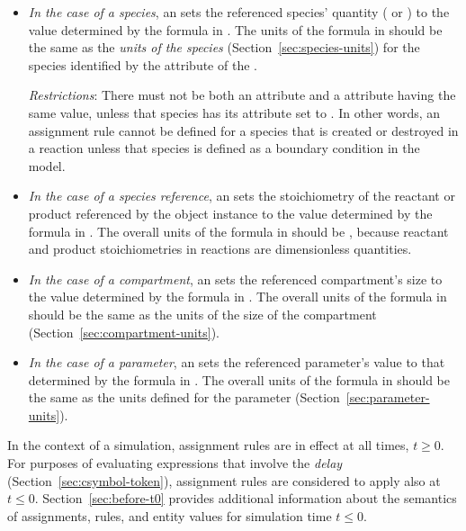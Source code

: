 \begin{itemize}
  
\item \emph{In the case of a species}, an \AssignmentRule sets the
  referenced species' quantity ( or
  ) to the value determined by the
  formula in .  The units of the formula in
   should be the same as the \emph{units of the species}
  (Section~\ref{sec:species-units}) for the species identified by
  the  attribute of the \AssignmentRule.
  
  \emph{Restrictions}: There must not be both an \AssignmentRule
   attribute and a \SpeciesReference {}
  attribute having the same value, unless that species has its
   attribute set to .  In other
  words, an assignment rule cannot be defined for a species that
  is created or destroyed in a reaction unless that species is
  defined as a boundary condition in the model.

\item \emph{In the case of a species reference}, an
  \AssignmentRule sets the stoichiometry of the reactant or
  product referenced by the \SpeciesReference object instance to
  the value determined by the formula in .  The
  overall units of the formula in  should be
  , because reactant and product
  stoichiometries in reactions are dimensionless quantities.

\item \emph{In the case of a compartment}, an \AssignmentRule sets
  the referenced compartment's size to the value determined by the
  formula in .  The overall units of the formula in
   should be the same as the units of the size of the
  compartment (Section~\ref{sec:compartment-units}).
  
\item \emph{In the case of a parameter}, an \AssignmentRule sets
  the referenced parameter's value to that determined by the
  formula in .  The overall units of the formula in
   should be the same as the units defined for the
  parameter (Section~\ref{sec:parameter-units}).

\end{itemize}

In the context of a simulation, assignment rules are in effect at
all times, $t \geq 0$.  For purposes of evaluating expressions
that involve the \emph{delay} 
(Section~\ref{sec:csymbol-token}), assignment rules are considered
to apply also at $t \leq 0$.  Section~\ref{sec:before-t0} provides
additional information about the semantics of assignments, rules,
and entity values for simulation time $t \leq 0$.

